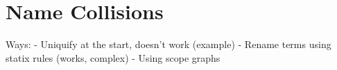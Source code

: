 \section{Name Collisions}

Ways:
- Uniquify at the start, doesn't work (example)
- Rename terms using statix rules (works, complex)
- Using scope graphs